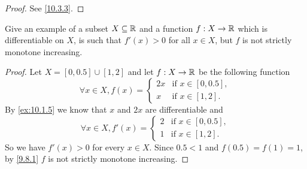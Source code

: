 \begin{proof}
  See \cref{10.3.3}.
\end{proof}

\begin{ex}\label{ex:10.3.5}
  Give an example of a subset \(X \subseteq \mathbb{R}\) and a function \(f : X \to \mathbb{R}\) which is differentiable on \(X\), is such that \(f'(x) > 0\) for all \(x \in X\), but \(f\) is not strictly monotone increasing.
\end{ex}

\begin{proof}
  Let \(X = [0, 0.5] \cup [1, 2]\) and let \(f : X \to \mathbb{R}\) be the following function
  \[
    \forall x \in X, f(x) = \begin{cases}
      2x & \text{if } x \in [0, 0.5], \\
      x  & \text{if } x \in [1, 2].
    \end{cases}
  \]
  By \cref{ex:10.1.5} we know that \(x\) and \(2x\) are differentiable and
  \[
    \forall x \in X, f'(x) = \begin{cases}
      2 & \text{if } x \in [0, 0.5], \\
      1 & \text{if } x \in [1, 2].
    \end{cases}
  \]
  So we have \(f'(x) > 0\) for every \(x \in X\).
  Since \(0.5 < 1\) and \(f(0.5) = f(1) = 1\), by \cref{9.8.1} \(f\) is not strictly monotone increasing.
\end{proof}